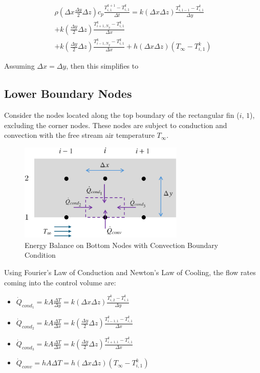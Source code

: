 \documentclass{article}
\newcommand{\ddfrac}[2]{\frac{\displaystyle #1}{\displaystyle #2}}
\begin{document}
\begin{multline*}
    \rho\left(\Delta x \ddfrac{\Delta y}{2} \Delta z\right) c_p \ddfrac{T_{i,1}^{k+1} - T_{i,1}^k}{\Delta t} = k(\Delta x \Delta z) \ddfrac{T_{i,1-1}^k - T_{i,1}^k}{\Delta y} \\
    + k(\ddfrac{\Delta y}{2} \Delta z) \ddfrac{T_{i+1,N_y}^k - T_{i,1}^k}{\Delta x} \\
    + k(\ddfrac{\Delta y}{2} \Delta z) \ddfrac{T_{i-1,N_y}^k - T_{i,1}^k}{\Delta x}
    + h(\Delta x \Delta z)\left(T_{\infty} - T_{i,1}^k\right)
\end{multline*}

Assuming $\Delta x = \Delta y$, then this simplifies to 
\begin{center}
    \noindent {}        
\end{center}


\subsection{Lower Boundary Nodes}
Consider the nodes located along the top boundary of the rectangular fin ($i$, $1$), excluding the corner nodes. These nodes are subject to conduction and convection with the free stream air temperature $T_{\infty}$.

\begin{figure}[h]
    \centering
    \includegraphics[width=0.7\textwidth]{fig/energyBottom.png}
    \caption{Energy Balance on Bottom Nodes with Convection Boundary Condition}
    \label{fig:energyBottom}
\end{figure}

Using Fourier's Law of Conduction and Newton's Law of Cooling, the flow rates coming into the control volume are:

\begin{itemize}
    \item $\dot{Q}_{cond_{1}} = kA\ddfrac{\Delta T}{\Delta y} = k(\Delta x \Delta z) \ddfrac{T_{i,2}^k - T_{i,1}^k}{\Delta y}$
    \item $\dot{Q}_{cond_{2}} = kA\ddfrac{\Delta T}{\Delta x} = k(\ddfrac{\Delta y}{2} \Delta z) \ddfrac{T_{i-1,1}^k - T_{i,1}^k}{\Delta x}$
    \item $\dot{Q}_{cond_{3}} = kA\ddfrac{\Delta T}{\Delta x} = k(\ddfrac{\Delta y}{2} \Delta z) \ddfrac{T_{i+1,1}^k - T_{i,1}^k}{\Delta x}$
    \item $\dot{Q}_{conv} = hA\Delta T = h(\Delta x \Delta z)\left(T_{\infty} - T_{i,1}^k\right)$
\end{itemize}
\end{document}
